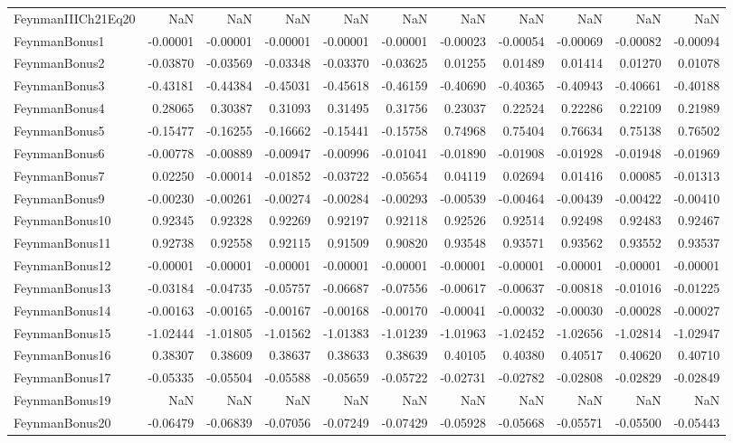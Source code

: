 \begin{tabular}{lrrrrrrrrrr}
FeynmanIIICh21Eq20 & NaN & NaN & NaN & NaN & NaN & NaN & NaN & NaN & NaN & NaN \\
FeynmanBonus1 & -0.00001 & -0.00001 & -0.00001 & -0.00001 & -0.00001 & -0.00023 & -0.00054 & -0.00069 & -0.00082 & -0.00094 \\
FeynmanBonus2 & -0.03870 & -0.03569 & -0.03348 & -0.03370 & -0.03625 & 0.01255 & 0.01489 & 0.01414 & 0.01270 & 0.01078 \\
FeynmanBonus3 & -0.43181 & -0.44384 & -0.45031 & -0.45618 & -0.46159 & -0.40690 & -0.40365 & -0.40943 & -0.40661 & -0.40188 \\
FeynmanBonus4 & 0.28065 & 0.30387 & 0.31093 & 0.31495 & 0.31756 & 0.23037 & 0.22524 & 0.22286 & 0.22109 & 0.21989 \\
FeynmanBonus5 & -0.15477 & -0.16255 & -0.16662 & -0.15441 & -0.15758 & 0.74968 & 0.75404 & 0.76634 & 0.75138 & 0.76502 \\
FeynmanBonus6 & -0.00778 & -0.00889 & -0.00947 & -0.00996 & -0.01041 & -0.01890 & -0.01908 & -0.01928 & -0.01948 & -0.01969 \\
FeynmanBonus7 & 0.02250 & -0.00014 & -0.01852 & -0.03722 & -0.05654 & 0.04119 & 0.02694 & 0.01416 & 0.00085 & -0.01313 \\
FeynmanBonus9 & -0.00230 & -0.00261 & -0.00274 & -0.00284 & -0.00293 & -0.00539 & -0.00464 & -0.00439 & -0.00422 & -0.00410 \\
FeynmanBonus10 & 0.92345 & 0.92328 & 0.92269 & 0.92197 & 0.92118 & 0.92526 & 0.92514 & 0.92498 & 0.92483 & 0.92467 \\
FeynmanBonus11 & 0.92738 & 0.92558 & 0.92115 & 0.91509 & 0.90820 & 0.93548 & 0.93571 & 0.93562 & 0.93552 & 0.93537 \\
FeynmanBonus12 & -0.00001 & -0.00001 & -0.00001 & -0.00001 & -0.00001 & -0.00001 & -0.00001 & -0.00001 & -0.00001 & -0.00001 \\
FeynmanBonus13 & -0.03184 & -0.04735 & -0.05757 & -0.06687 & -0.07556 & -0.00617 & -0.00637 & -0.00818 & -0.01016 & -0.01225 \\
FeynmanBonus14 & -0.00163 & -0.00165 & -0.00167 & -0.00168 & -0.00170 & -0.00041 & -0.00032 & -0.00030 & -0.00028 & -0.00027 \\
FeynmanBonus15 & -1.02444 & -1.01805 & -1.01562 & -1.01383 & -1.01239 & -1.01963 & -1.02452 & -1.02656 & -1.02814 & -1.02947 \\
FeynmanBonus16 & 0.38307 & 0.38609 & 0.38637 & 0.38633 & 0.38639 & 0.40105 & 0.40380 & 0.40517 & 0.40620 & 0.40710 \\
FeynmanBonus17 & -0.05335 & -0.05504 & -0.05588 & -0.05659 & -0.05722 & -0.02731 & -0.02782 & -0.02808 & -0.02829 & -0.02849 \\
FeynmanBonus19 & NaN & NaN & NaN & NaN & NaN & NaN & NaN & NaN & NaN & NaN \\
FeynmanBonus20 & -0.06479 & -0.06839 & -0.07056 & -0.07249 & -0.07429 & -0.05928 & -0.05668 & -0.05571 & -0.05500 & -0.05443 \\
\bottomrule
\end{tabular}
